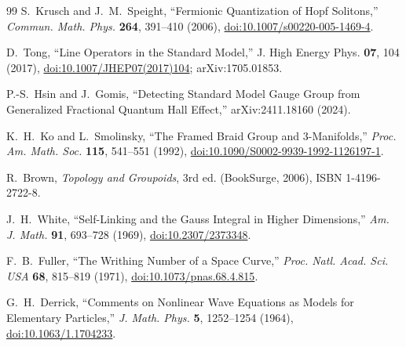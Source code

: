 \documentclass[aps,prd,reprint,superscriptaddress,nofootinbib,longbibliography,floatfix]{revtex4-2}
\begin{document}
\begin{thebibliography}{99}
S.~Krusch and J.~M.~Speight,
``Fermionic Quantization of Hopf Solitons,''
\textit{Commun. Math. Phys.} \textbf{264}, 391--410 (2006),
\href{https://doi.org/10.1007/s00220-005-1469-4}{doi:10.1007/s00220-005-1469-4}.

D.~Tong,
``Line Operators in the Standard Model,''
J. High Energy Phys. \textbf{07}, 104 (2017),
\href{https://doi.org/10.1007/JHEP07(2017)104}{doi:10.1007/JHEP07(2017)104};
arXiv:1705.01853.

P.-S.~Hsin and J.~Gomis,
``Detecting Standard Model Gauge Group from Generalized Fractional Quantum Hall Effect,''
arXiv:2411.18160 (2024).


K.~H.~Ko and L.~Smolinsky,
``The Framed Braid Group and 3-Manifolds,''
\textit{Proc. Am. Math. Soc.} \textbf{115}, 541--551 (1992),
\href{https://doi.org/10.1090/S0002-9939-1992-1126197-1}{doi:10.1090/S0002-9939-1992-1126197-1}.

R.~Brown,
\textit{Topology and Groupoids}, 3rd ed. (BookSurge, 2006),
ISBN 1-4196-2722-8.

J.~H.~White,
``Self-Linking and the Gauss Integral in Higher Dimensions,''
\textit{Am. J. Math.} \textbf{91}, 693--728 (1969),
\href{https://doi.org/10.2307/2373348}{doi:10.2307/2373348}.

F.~B.~Fuller,
``The Writhing Number of a Space Curve,''
\textit{Proc. Natl. Acad. Sci. USA} \textbf{68}, 815--819 (1971),
\href{https://doi.org/10.1073/pnas.68.4.815}{doi:10.1073/pnas.68.4.815}.

G.~H.~Derrick,
``Comments on Nonlinear Wave Equations as Models for Elementary Particles,''
\textit{J. Math. Phys.} \textbf{5}, 1252--1254 (1964),
\href{https://doi.org/10.1063/1.1704233}{doi:10.1063/1.1704233}.

\end{thebibliography}
\end{document}
